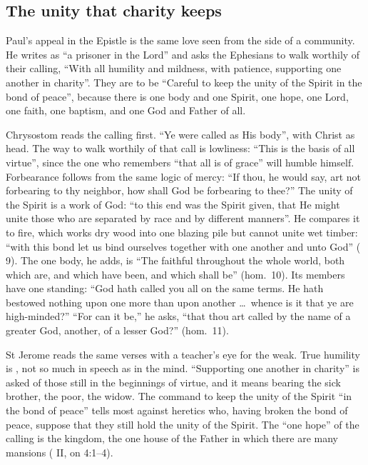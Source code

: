 \subsection{The unity that charity keeps}

Paul's appeal in the Epistle is the same love seen from the side of a
community. He writes as ``a prisoner in the Lord'' and asks the Ephesians to
walk worthily of their calling, ``With all humility and mildness, with
patience, supporting one another in charity''. They are to be ``Careful to
keep the unity of the Spirit in the bond of peace'', because there is one
body and one Spirit, one hope, one Lord, one faith, one baptism, and one God
and Father of all.

Chrysostom reads the calling first. ``Ye were called as His body'', with
Christ as head. The way to walk worthily of that call is lowliness: ``This is
the basis of all virtue'', since the one who remembers ``that all is of grace''
will humble himself. Forbearance follows from the same logic of mercy: ``If
thou, he would say, art not forbearing to thy neighbor, how shall God be
forbearing to thee?'' The unity of the Spirit is a work of God: ``to this end
was the Spirit given, that He might unite those who are separated by race and
by different manners''. He compares it to fire, which works dry wood into one
blazing pile but cannot unite wet timber: ``with this bond let us bind
ourselves together with one another and unto God'' ( 9). The one body, he adds, is ``The faithful throughout the whole
world, both which are, and which have been, and which shall be'' (hom.~10).
Its members have one standing: ``God hath called you all on the same terms.
He hath bestowed nothing upon one more than upon another \dots\ whence is it
that ye are high-minded?'' ``For can it be,'' he asks, ``that thou art called by
the name of a greater God, another, of a lesser God?'' (hom.~11).

St Jerome reads the same verses with a teacher's eye for the weak. True
humility is , not so much in speech
as in the mind. ``Supporting one another in charity'' is asked of those
still in the beginnings of virtue, and it means bearing the sick brother, the
poor, the widow. The command to keep the unity of the Spirit ``in the bond of
peace'' tells most against heretics who, having broken the bond of peace,
suppose that they still hold the unity of the Spirit. The ``one hope'' of the
calling is the kingdom, the one house of the Father in which there are many
mansions ( II, on 4:1--4).

